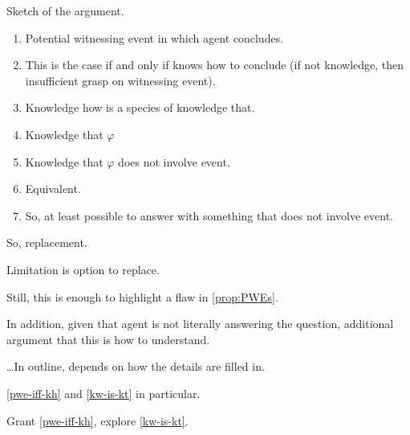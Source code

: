 \begin{note}
  Sketch of the argument.

  \begin{enumerate}
  \item
    Potential witnessing event in which agent concludes.
  \item
    \label{pwe-iff-kh}
    This is the case if and only if knows how to conclude (if not knowledge, then insufficient grasp on witnessing event).
  \item
    \label{kw-is-kt}
    Knowledge how is a species of knowledge that.
  \item
    Knowledge that \(\varphi\)
  \item
    Knowledge that \(\varphi\) does not involve event.
  \item
    Equivalent.
  \item
    So, at least possible to answer with something that does not involve event.
  \end{enumerate}

  So, replacement.

  Limitation is option to replace.

  Still, this is enough to highlight a flaw in \autoref{prop:PWEs}.

  In addition, given that agent is not literally answering the question, additional argument that this is how to understand.
\end{note}

\begin{note}
  \dots In outline, depends on how the details are filled in.

  \autoref{pwe-iff-kh} and \autoref{kw-is-kt} in particular.

  Grant \autoref{pwe-iff-kh}, explore \autoref{kw-is-kt}.
\end{note}


